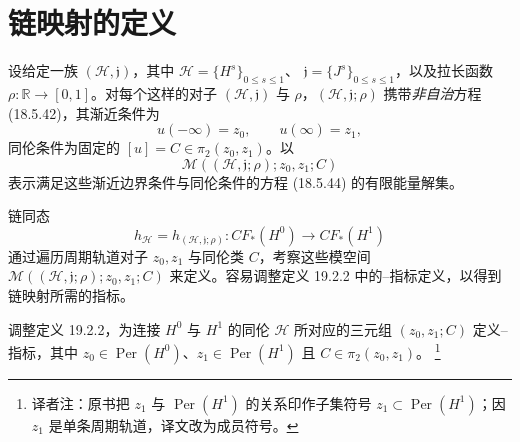 \section{\personFloer{}链映射的定义}
\label{sec:def-floer-chain-map}

设给定一族 $(\mathcal H,\mathfrak j)$，其中
$\mathcal H=\{H^s\}_{0\leq s\leq1}$、
$\mathfrak j=\{J^s\}_{0\leq s\leq1}$，以及拉长函数
$\rho:\mathbb R\to[0,1]$。对每个这样的对子 $(\mathcal H,\mathfrak j)$ 与
$\rho$，$(\mathcal H,\mathfrak j;\rho)$ 携带\emph{非自治}方程 (18.5.42)，其渐近条件为
\begin{equation}
 u(-\infty)=z_0,\qquad u(\infty)=z_1,
\label{eq:19-chain-map-asymptotics}
\end{equation}
同伦条件为固定的 $[u]=C\in\pi_2(z_0,z_1)$。以
\[
 \mathcal M((\mathcal H,\mathfrak j;\rho);z_0,z_1;C)
\]
表示满足这些渐近边界条件与同伦条件的方程 (18.5.44) 的有限能量解集。

链同态
\[
 h_{\mathcal H}=h_{(\mathcal H,\mathfrak j;\rho)}:
 CF_*(H^0)\longrightarrow CF_*(H^1)
\]
通过遍历周期轨道对子 $z_0,z_1$ 与同伦类 $C$，考察这些模空间
$\mathcal M((\mathcal H,\mathfrak j;\rho);z_0,z_1;C)$ 来定义。容易调整定义 19.2.2
中的\personConley{}--\personZehnder{}指标定义，以得到链映射所需的指标。

\begin{exercise}
\label{ex:cz-index-continuation-triple}
调整定义 19.2.2，为连接 $H^0$ 与 $H^1$ 的同伦 $\mathcal H$ 所对应的三元组
$(z_0,z_1;C)$ 定义\personConley{}--\personZehnder{}指标，其中
$z_0\in\operatorname{Per}(H^0)$、$z_1\in\operatorname{Per}(H^1)$ 且
$C\in\pi_2(z_0,z_1)$。
\footnote{译者注：原书把 $z_1$ 与 $\operatorname{Per}(H^1)$ 的关系印作子集符号
$z_1\subset\operatorname{Per}(H^1)$；因 $z_1$ 是单条周期轨道，译文改为成员符号。}
\end{exercise}

